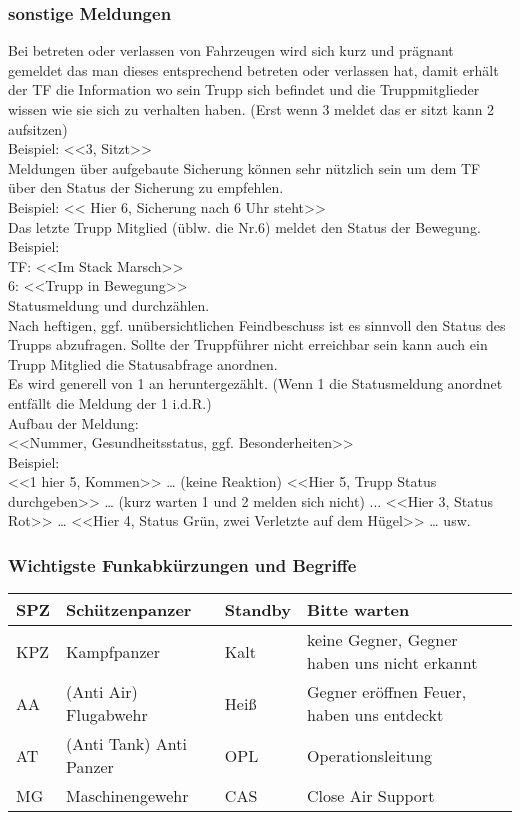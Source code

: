 \subsubsection{sonstige Meldungen}
Bei betreten oder verlassen von Fahrzeugen wird sich kurz und prägnant gemeldet das man dieses entsprechend betreten oder verlassen hat, damit erhält der TF die Information wo sein Trupp sich befindet und die Truppmitglieder wissen wie sie sich zu verhalten haben. (Erst wenn 3 meldet das er sitzt kann 2 aufsitzen) \\
Beispiel:  <<3, Sitzt>> \\

Meldungen über aufgebaute Sicherung können sehr nützlich sein um dem TF über den Status der Sicherung zu empfehlen. \\
Beispiel: << Hier 6, Sicherung nach 6 Uhr steht>> \\

Das letzte Trupp Mitglied (üblw. die Nr.6) meldet den Status der Bewegung. \\
Beispiel: \\
TF: <<Im Stack Marsch>> \\
6: <<Trupp in Bewegung>>  \\
Statusmeldung und durchzählen. \\
Nach heftigen, ggf. unübersichtlichen Feindbeschuss ist es sinnvoll den Status des Trupps abzufragen. Sollte der Truppführer nicht erreichbar sein kann auch ein Trupp Mitglied die Statusabfrage anordnen. \\
Es wird generell von 1 an heruntergezählt. (Wenn 1 die Statusmeldung  anordnet entfällt die Meldung der 1 i.d.R.)  \\
Aufbau der Meldung: \\
<<Nummer, Gesundheitsstatus, ggf. Besonderheiten>>  \\
Beispiel:\\
 <<1 hier 5, Kommen>> … (keine Reaktion)  <<Hier 5, Trupp Status durchgeben>> … (kurz warten 1 und 2 melden sich nicht) ... <<Hier 3, Status Rot>> … <<Hier 4, Status Grün, zwei Verletzte auf dem Hügel>> … usw. \\
\subsubsection{Wichtigste Funkabkürzungen und Begriffe}
\begin{tabular}{|p{2cm}|p{4cm}|p{3cm}|p{4cm}|} \hline
SPZ &	Schützenpanzer	& Standby &	Bitte warten \\ \hline 
KPZ	 & Kampfpanzer	& Kalt	& keine Gegner, Gegner haben uns nicht erkannt \\ \hline
AA	& (Anti Air) Flugabwehr	& Heiß &	Gegner eröffnen Feuer, haben uns entdeckt \\ \hline
AT	& (Anti Tank) Anti Panzer	& OPL	& Operationsleitung \\ \hline
MG	& Maschinengewehr	& CAS	& Close Air Support \\ \hline
\end{tabular}


